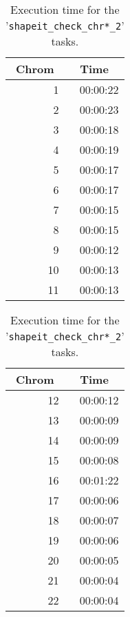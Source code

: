 \documentclass[10pt,twoside,english]{scrartcl}
\begin{document}
\begin{table}[H]
\protect\caption{Execution time for the '\texttt{shapeit\_check\_chr*\_2}' tasks.\label{tab:shapeit_check_2_exec_time}}

\centering

\begin{tabular}{rr}
\hline 
\multicolumn{1}{c}{\textbf{Chrom}}
 & \multicolumn{1}{c}{\textbf{Time}}
\\
\hline 

1 & {\color{light_gray}00:00:}22\\
2 & {\color{light_gray}00:00:}23\\
3 & {\color{light_gray}00:00:}18\\
4 & {\color{light_gray}00:00:}19\\
5 & {\color{light_gray}00:00:}17\\
6 & {\color{light_gray}00:00:}17\\
7 & {\color{light_gray}00:00:}15\\
8 & {\color{light_gray}00:00:}15\\
9 & {\color{light_gray}00:00:}12\\
10 & {\color{light_gray}00:00:}13\\
11 & {\color{light_gray}00:00:}13\\
\hline 
\end{tabular}
\hspace{1cm}
\begin{tabular}{rr}
\hline 
\multicolumn{1}{c}{\textbf{Chrom}}
 & \multicolumn{1}{c}{\textbf{Time}}
\\
\hline 

12 & {\color{light_gray}00:00:}12\\
13 & {\color{light_gray}00:00:0}9\\
14 & {\color{light_gray}00:00:0}9\\
15 & {\color{light_gray}00:00:0}8\\
16 & {\color{light_gray}00:0}1:22\\
17 & {\color{light_gray}00:00:0}6\\
18 & {\color{light_gray}00:00:0}7\\
19 & {\color{light_gray}00:00:0}6\\
20 & {\color{light_gray}00:00:0}5\\
21 & {\color{light_gray}00:00:0}4\\
22 & {\color{light_gray}00:00:0}4\\
\hline 
\end{tabular}


\end{table}
\end{document}
